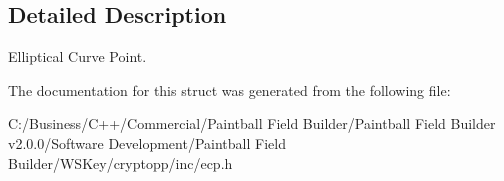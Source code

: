 \subsection{Detailed Description}
Elliptical Curve Point. 

The documentation for this struct was generated from the following file:\begin{DoxyCompactItemize}
\item 
C:/Business/C++/Commercial/Paintball Field Builder/Paintball Field Builder v2.0.0/Software Development/Paintball Field Builder/WSKey/cryptopp/inc/ecp.h\end{DoxyCompactItemize}
